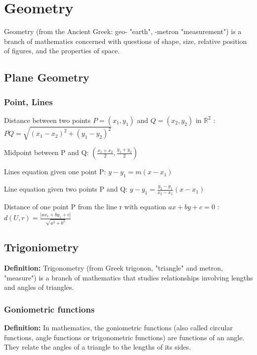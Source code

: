\chapter{Geometry}
Geometry (from the Ancient Greek: geo- "earth", -metron "measurement") is a branch of mathematics concerned with questions of shape, size, relative position of figures, and the properties of space.







\section{Plane Geometry}
\subsection{Point, Lines}
Distance between two points $P=(x_1,y_1)$ and $Q=(x_2,y_2)$ in $\mathbb{R}^2$ : $ \overline{PQ} = \sqrt{(x_1-x_2)^2+(y_1-y_2)^2} $

Midpoint between P and Q: $\left(\frac{x_1+x_2}{2},\frac{y_1+y_2}{2}\right)$

Lines equation given one point P: $ y-y_1 = m(x-x_1) $

Line equation given two points P and Q: $ y-y_1 = \frac{y_2-y_1}{x_2-x_1}(x-x_1) $

Distance of one point P from the line r with equation $ax+by+c=0$ : $ d(U,r) = \frac{\left|ax_1+by_1+c\right|}{\sqrt{a^2+b^2}}$







\section{Trigoniometry}
\textbf{Definition:} Trigonometry (from Greek trigonon, "triangle" and metron, "measure") is a branch of mathematics that studies relationships involving lengths and angles of triangles.

\subsection{Goniometric functions}
\textbf{Definition:} In mathematics, the goniometric functions (also called circular functions, angle functions or trigonometric functions) are functions of an angle. They relate the angles of a triangle to the lengths of its sides. 


